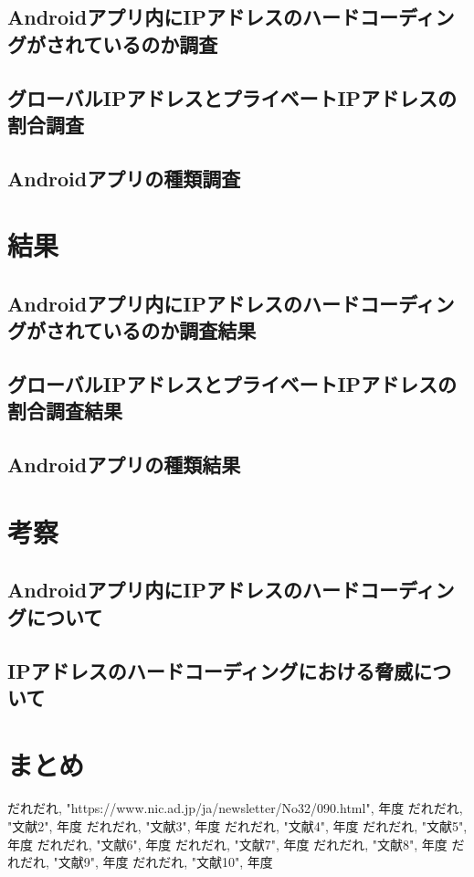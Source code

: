 \documentclass[a4j]{jarticle}
\begin{document}
\subsection{Androidアプリ内にIPアドレスのハードコーディングがされているのか調査}

\subsection{グローバルIPアドレスとプライベートIPアドレスの割合調査}

\subsection{Androidアプリの種類調査}

\newpage
\section{結果}
\subsection{Androidアプリ内にIPアドレスのハードコーディングがされているのか調査結果}
\subsection{グローバルIPアドレスとプライベートIPアドレスの割合調査結果}
\subsection{Androidアプリの種類結果}


\newpage
\section{考察}
\subsection{Androidアプリ内にIPアドレスのハードコーディングについて}
\subsection{IPアドレスのハードコーディングにおける脅威について}

\newpage
\section{まとめ}

\newpage
\begin{thebibliography}{99}
だれだれ, "https://www.nic.ad.jp/ja/newsletter/No32/090.html", 年度
だれだれ, "文献2", 年度
だれだれ, "文献3", 年度
だれだれ, "文献4", 年度
だれだれ, "文献5", 年度
だれだれ, "文献6", 年度
だれだれ, "文献7", 年度
だれだれ, "文献8", 年度
だれだれ, "文献9", 年度
だれだれ, "文献10", 年度

\end{thebibliography}
\end{document}
